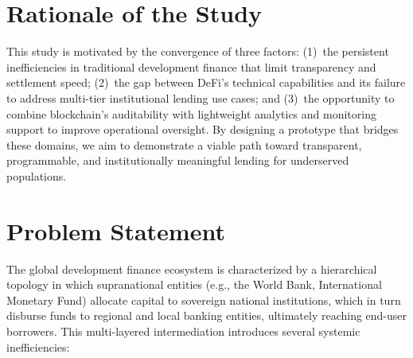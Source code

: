 \documentclass[12pt,a4paper]{report}
\begin{document}
\section{Rationale of the Study}

This study is motivated by the convergence of three factors: (1)~the persistent inefficiencies in traditional development finance that limit transparency and settlement speed; (2)~the gap between DeFi's technical capabilities and its failure to address multi-tier institutional lending use cases; and (3)~the opportunity to combine blockchain's auditability with lightweight analytics and monitoring support to improve operational oversight. By designing a prototype that bridges these domains, we aim to demonstrate a viable path toward transparent, programmable, and institutionally meaningful lending for underserved populations.

\section{Problem Statement}

The global development finance ecosystem is characterized by a hierarchical topology in which supranational entities (e.g., the World Bank, International Monetary Fund) allocate capital to sovereign national institutions, which in turn disburse funds to regional and local banking entities, ultimately reaching end-user borrowers. This multi-layered intermediation introduces several systemic inefficiencies:
\end{document}
